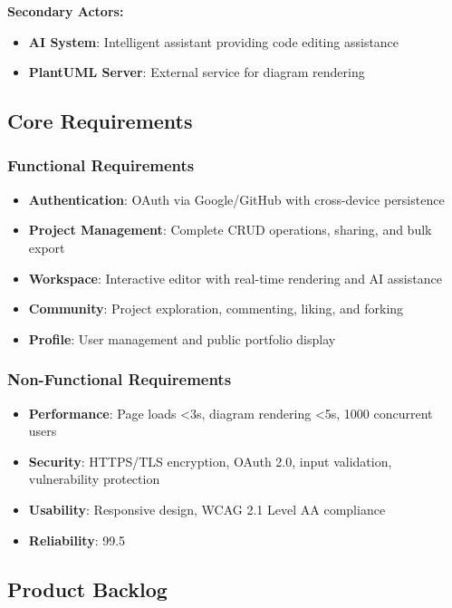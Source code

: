 \textbf{Secondary Actors:}
\begin{itemize}
    \item \textbf{AI System}: Intelligent assistant providing code editing assistance
    \item \textbf{PlantUML Server}: External service for diagram rendering
\end{itemize}

\subsection{Core Requirements}

\subsubsection{Functional Requirements}
\begin{itemize}
    \item \textbf{Authentication}: OAuth via Google/GitHub with cross-device persistence
    \item \textbf{Project Management}: Complete CRUD operations, sharing, and bulk export
    \item \textbf{Workspace}: Interactive editor with real-time rendering and AI assistance
    \item \textbf{Community}: Project exploration, commenting, liking, and forking
    \item \textbf{Profile}: User management and public portfolio display
\end{itemize}

\subsubsection{Non-Functional Requirements}
\begin{itemize}
    \item \textbf{Performance}: Page loads <3s, diagram rendering <5s, 1000 concurrent users
    \item \textbf{Security}: HTTPS/TLS encryption, OAuth 2.0, input validation, vulnerability protection
    \item \textbf{Usability}: Responsive design, WCAG 2.1 Level AA compliance
    \item \textbf{Reliability}: 99.5%
\end{itemize}
\subsection{Product Backlog}

